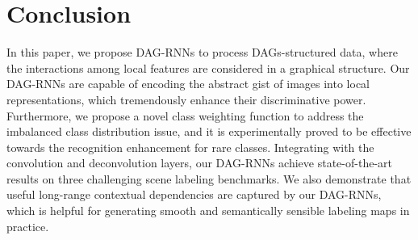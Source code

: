 \documentclass[10pt,twocolumn,letterpaper]{article}
\begin{document}
\section{Conclusion}
\label{Section:conclusion}
\vspace{-5pt}
In this paper,
we propose DAG-RNNs to process DAGs-structured data, where the interactions among local features are considered in a graphical structure. Our DAG-RNNs are capable of encoding the abstract gist of images into local representations, which tremendously enhance their discriminative power. Furthermore, we propose a novel class weighting function to address the imbalanced class distribution issue, and it is experimentally proved to be effective towards the recognition enhancement for rare classes. Integrating with the convolution and deconvolution layers, our DAG-RNNs achieve state-of-the-art results on three challenging scene labeling benchmarks. We also demonstrate that useful long-range contextual dependencies are captured by our DAG-RNNs, which is helpful for generating smooth and semantically sensible labeling maps in practice.



{\small


}
\end{document}
